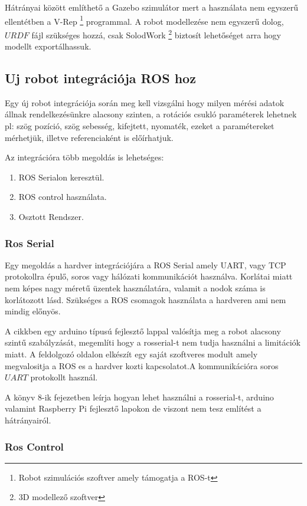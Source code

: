 Hátrányai között említhető a Gazebo szimulátor mert a használata nem egyszerű ellentétben a V-Rep \footnote{Robot szimulációs szoftver amely támogatja a ROS-t} programmal. A robot modellezése nem egyszerű dolog, $URDF$ fájl szükséges hozzá, csak SolodWork \footnote{3D modellező szoftver} biztosít  lehetőséget arra hogy modellt exportálhassuk.

\subsection{Uj robot integrációja ROS hoz}
Egy új robot integrációja során meg kell vizsgálni hogy milyen mérési adatok állnak rendelkezésünkre alacsony szinten, a rotációs csukló  paraméterek lehetnek pl: szög pozíció, szög sebesség, kifejtett, nyomaték, ezeket a paramétereket mérhetjük, illetve referenciaként is előírhatjuk. 

Az integrációra több megoldás is lehetséges:
\begin{enumerate}[label=(\alph*)]
	\item ROS Serialon keresztül.
	\item ROS control használata.
	\item Osztott Rendszer.
\end{enumerate}

\subsubsection*{Ros Serial}
Egy megoldás a hardver integrációjára a ROS Serial amely UART, vagy TCP protokollra épulő, soros vagy hálózati kommunikációt használva. Korlátai miatt \cite{RosSerial} nem képes nagy méretű üzentek használatára, valamit a nodok száma is korlátozott lásd. Szükséges a ROS csomagok használata a hardveren ami nem mindig előnyös.

A \cite{ROSArduino2013} cikkben egy arduino típusú fejlesztő lappal valósítja meg a robot alacsony szintű szabályzását, megemlíti hogy a rosserial-t nem tudja használni a limitációk miatt. A feldolgozó oldalon elkészít egy saját szoftveres modult amely megvalositja a ROS es a hardver kozti kapcsolatot.A kommunikációra soros $UART$ protokollt használ.

A \cite{ROSRoboticsByExampleSecEd} könyv 8-ik fejezetben leírja hogyan lehet használni a rosserial-t, arduino valamint Raspberry Pi fejlesztő lapokon de viszont nem tesz említést a hátrányairól.

\subsubsection*{Ros Control}

